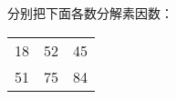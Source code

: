 
分别把下面各数分解素因数：\\
\begin{tabular}{ccc}
18\hspace{10em} & 52\hspace{10em} & 45\hspace{10em}\\
51\hspace{10em} & 75\hspace{10em} & 84\hspace{10em}\\
\end{tabular}

